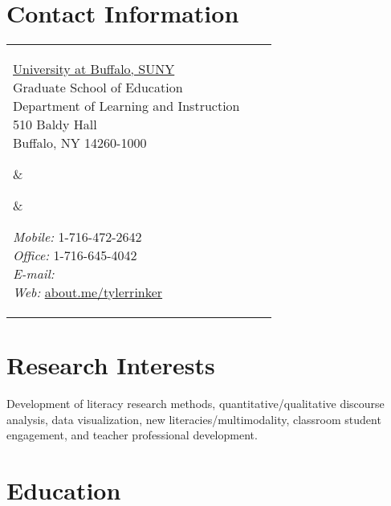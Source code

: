 


\section{Contact Information}


\newlength{\rcollength}\setlength{\rcollength}{2.1in}%
\newlength{\spacewidth}\setlength{\spacewidth}{20pt}
\begin{tabular}[t]{@{}p{\textwidth-\rcollength-\spacewidth}@{}p{\spacewidth}@{}p{\rcollength}}%

\parbox{\textwidth-\rcollength-\spacewidth}{%
\href{http://www.buffalo.edu/}{University at Buffalo, SUNY}\\
Graduate School of Education\\
Department of Learning and Instruction\\	
510 Baldy Hall\\
Buffalo, NY 14260-1000\\}

&
\parbox[m][5\baselineskip]{\spacewidth}{} &

\parbox{\rcollength}{%
\textit{Mobile:} 1-716-472-2642 \\
\textit{Office:} 1-716-645-4042 \\
\textit{E-mail:} \\
\textit{Web:} \href{http://about.me/tylerrinker}{about.me/tylerrinker}}

\end{tabular}

\section{Research Interests}

Development of literacy research methods, quantitative/qualitative discourse analysis, data visualization, new literacies/multimodality, classroom student engagement, and teacher professional development.

\section{Education}

